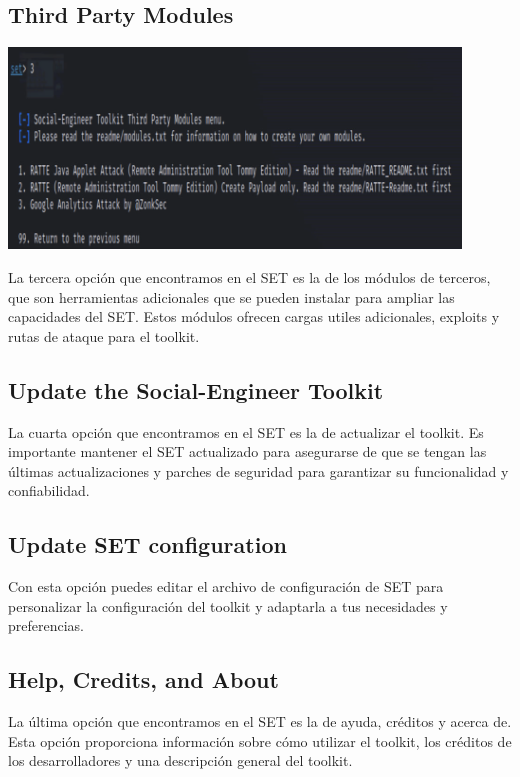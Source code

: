 \documentclass[12pt]{article}
\begin{document}
\newpage

\subsection{Third Party Modules}

\begin{center}
    \includegraphics[width=12cm]{tpm.png}
\end{center}

\noindent
La tercera opción que encontramos en el SET es la de los módulos de terceros, que son herramientas adicionales que se pueden instalar para ampliar las capacidades del SET. Estos módulos ofrecen cargas utiles adicionales, exploits y rutas de ataque para el toolkit.

\subsection{Update the Social-Engineer Toolkit}

\noindent
La cuarta opción que encontramos en el SET es la de actualizar el toolkit. Es importante mantener el SET actualizado para asegurarse de que se tengan las últimas actualizaciones y parches de seguridad para garantizar su funcionalidad y confiabilidad.

\subsection{Update SET configuration}

\noindent
Con esta opción puedes editar el archivo de configuración de SET para personalizar la configuración del toolkit y adaptarla a tus necesidades y preferencias.

\subsection{Help, Credits, and About}

\noindent
La última opción que encontramos en el SET es la de ayuda, créditos y acerca de. Esta opción proporciona información sobre cómo utilizar el toolkit, los créditos de los desarrolladores y una descripción general del toolkit.
\end{document}
